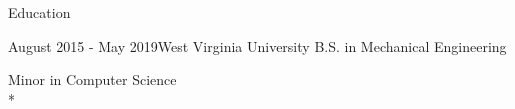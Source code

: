 \documentclass{article}
\newlength{\tabin}
\newlength{\secsep}
\newcommand{\lineunder}{\vspace*{-8pt} \\ \hspace*{-6pt} \hrulefill \\ \vspace*{-15pt}}
\newenvironment{tabbedsection}[1]{
	\begin{list}{}{
			\setlength{\itemsep}{0pt}
			\setlength{\labelsep}{0pt}
			\setlength{\labelwidth}{0pt}
			\setlength{\leftmargin}{0pt}
			\setlength{\rightmargin}{\tabin}
			\setlength{\listparindent}{0pt}
			\setlength{\parsep}{0pt}
			\setlength{\parskip}{0pt}
			\setlength{\partopsep}{0pt}
			\setlength{\topsep}{#1}
		}
		\item[]
	}{\end{list}}
\newenvironment{resume_section}[1]{
	\filbreak
	\vspace{2\secsep}
	\textsc{\color{blue}\large#1}
	\lineunder
	\begin{tabbedsection}{\secsep}
	}{\end{tabbedsection}}
\newenvironment{resume_subsection}[2]{
	\textbf{\color{BlueViolet}#2} \hfill {\normalsize (#1)} \hspace{-5em}
	\begin{tabbedsection}{0.5\secsep}
		\begin{subitems}
		}{\end{subitems}\end{tabbedsection}}
\newenvironment{subitems}{
	\renewcommand{\labelitemi}{-}
	\begin{itemize}
		\setlength{\labelsep}{1em}
	}{\end{itemize}}
\begin{document}
	\vspace{2\secsep}	
	
	\begin{resume_section}{Education}
		\begin{resume_subsection}{August 2015 - May 2019}{West Virginia University}
			B.S. in Mechanical Engineering \hspace{8.75cm}	\par
			Minor in Computer Science  \hspace{9cm} \\*
		\end{resume_subsection}
	\end{resume_section}
	
	\vspace{-3\secsep}
	
\end{document}
